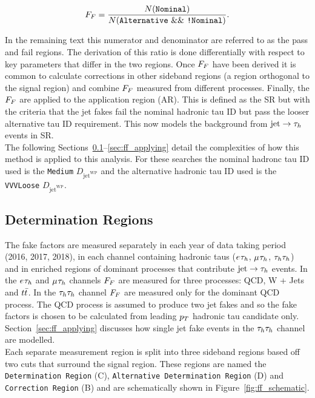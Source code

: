 \begin{equation}
F_{F} = \frac{N(\texttt{Nominal})}{N(\texttt{Alternative}~\&\&~\texttt{!Nominal})}.
\label{eqn:ff}
\end{equation}

In the remaining text this numerator and denominator are referred to as the pass and fail regions.
The derivation of this ratio is done differentially with respect to key parameters that differ in the two regions.
Once $F_{F}$ have been derived it is common to calculate corrections in other sideband regions (a region orthogonal to the signal region) and combine $F_{F}$ measured from different processes.
Finally, the $F_{F}$ are applied to the application region (AR). 
This is defined as the SR but with the criteria that the jet fakes fail the nominal hadronic tau ID but pass the looser alternative tau ID requirement.
This now models the background from $\text{jet}\rightarrow\tau_{h}$ events in SR. \\

The following Sections~\ref{sec:ff_dr}--\ref{sec:ff_applying} detail the complexities of how this method is applied to this analysis.
For these searches the nominal hadronc tau ID used is the \texttt{Medium} $D_{\text{jet}^{\text{WP}}}$ and the alternative hadronic tau ID used is the \texttt{VVVLoose}  $D_{\text{jet}^{\text{WP}}}$.

\subsection{Determination Regions}
\label{sec:ff_dr}

The fake factors are measured separately in each year of data taking period (2016, 2017, 2018), in each channel containing hadronic taus ($e_{}\tau_{h}$, $\mu_{}\tau_{h}$, $\tau_{h}\tau_{h}$) and in enriched regions of dominant processes that contribute $\text{jet}\rightarrow\tau_{h}$ events.
In the $e_{}\tau_{h}$ and $\mu_{}\tau_{h}$ channels $F_{F}$ are measured for three processes: QCD, W + Jets and $t\bar{t}$.
In the $\tau_{h}\tau_{h}$ channel $F_{F}$ are measured only for the dominant QCD process.
The QCD process is assumed to produce two jet fakes and so the fake factors is chosen to be calculated from leading $p_{T}$ hadronic tau candidate only. 
Section~\ref{sec:ff_applying} discusses how single jet fake events in the $\tau_{h}\tau_{h}$ channel are modelled. \\

Each separate measurement region is split into three sideband regions based off two cuts that surround the signal region.
These regions are named the \texttt{Determination Region} (C), \texttt{Alternative Determination Region} (D) and \texttt{Correction Region} (B) and are schematically shown in Figure~\ref{fig:ff_schematic}. \\

